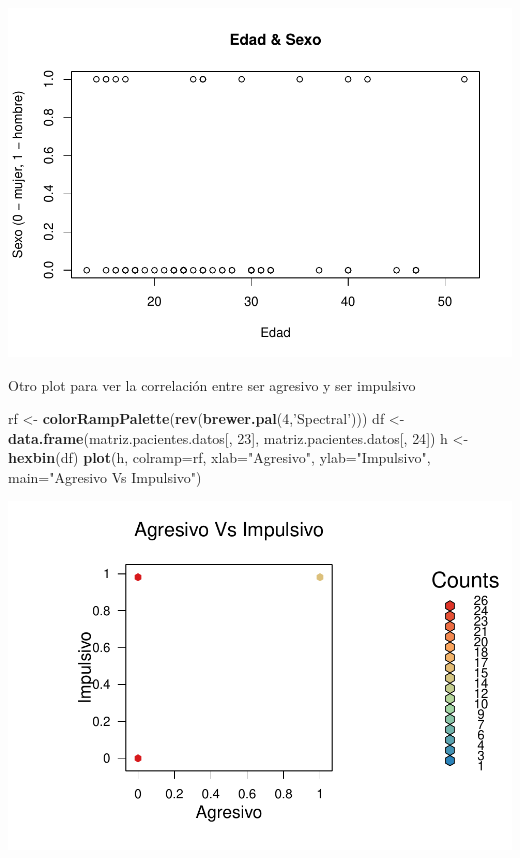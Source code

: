\documentclass[]{article}
\newenvironment{Shaded}{\begin{snugshade}}{\end{snugshade}}
\newcommand{\KeywordTok}[1]{\textcolor[rgb]{0.13,0.29,0.53}{\textbf{#1}}}
\newcommand{\DataTypeTok}[1]{\textcolor[rgb]{0.13,0.29,0.53}{#1}}
\newcommand{\DecValTok}[1]{\textcolor[rgb]{0.00,0.00,0.81}{#1}}
\newcommand{\StringTok}[1]{\textcolor[rgb]{0.31,0.60,0.02}{#1}}
\newcommand{\NormalTok}[1]{#1}
\begin{document}
\includegraphics{codigo_files/figure-latex/grafico_edad_sexo-1.pdf}

Otro plot para ver la correlación entre ser agresivo y ser impulsivo

\begin{Shaded}
\begin{Highlighting}[]
\NormalTok{rf <-}\StringTok{ }\KeywordTok{colorRampPalette}\NormalTok{(}\KeywordTok{rev}\NormalTok{(}\KeywordTok{brewer.pal}\NormalTok{(}\DecValTok{4}\NormalTok{,}\StringTok{'Spectral'}\NormalTok{)))}
\NormalTok{df <-}\StringTok{ }\KeywordTok{data.frame}\NormalTok{(matriz.pacientes.datos[, }\DecValTok{23}\NormalTok{], matriz.pacientes.datos[, }\DecValTok{24}\NormalTok{])}
\NormalTok{h <-}\StringTok{ }\KeywordTok{hexbin}\NormalTok{(df)}
\KeywordTok{plot}\NormalTok{(h, }\DataTypeTok{colramp=}\NormalTok{rf, }\DataTypeTok{xlab=}\StringTok{"Agresivo"}\NormalTok{, }\DataTypeTok{ylab=}\StringTok{"Impulsivo"}\NormalTok{, }\DataTypeTok{main=}\StringTok{"Agresivo Vs Impulsivo"}\NormalTok{)}
\end{Highlighting}
\end{Shaded}

\includegraphics{codigo_files/figure-latex/grafico_agresivo_impulsivo-1.pdf}
\end{document}

